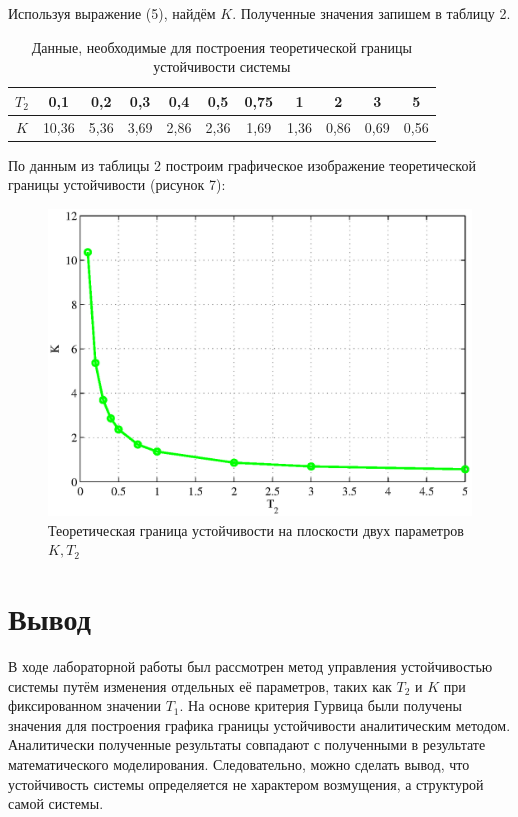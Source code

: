 \documentclass[a4paper,12pt]{article} %
\begin{document}
Используя выражение (5), найдём $K$. Полученные значения запишем в таблицу 2.
\begin{table}[h!]
	\caption{Данные, необходимые для построения теоретической границы устойчивости системы}
	\renewcommand{\arraystretch}{1.8} %
	\begin{center}
		\begin{tabular}{|c|c|c|c|c|c|c|c|c|c|c|}
			\hline $T_2$ & 0,1 & 0,2 & 0,3 & 0,4 & 0,5 & 0,75 & 1 & 2 & 3 & 5\\
			\hline $K$ & 10,36 & 5,36 & 3,69 & 2,86 & 2,36 & 1,69 & 1,36 & 0,86 & 0,69 & 0,56\\
			\hline
		\end{tabular}	
	\end{center}
\end{table}  
 
По данным из таблицы 2 построим графическое изображение теоретической границы устойчивости (рисунок 7):
\begin{figure}[H]
	\centering
	\includegraphics[width=1\linewidth]{scheme/plot4.eps}
	\caption{Теоретическая граница устойчивости на плоскости двух параметров $K, T_2$}
\end{figure}

\newpage
\section*{Вывод}
\par
В ходе лабораторной работы был рассмотрен метод управления устойчивостью системы путём изменения отдельных её параметров, таких как  $T_2$ и $K$ при фиксированном значении $T_1$. На основе критерия Гурвица были получены значения для построения графика границы устойчивости аналитическим методом. Аналитически полученные результаты совпадают с полученными в результате математического моделирования. Следовательно, можно сделать вывод, что устойчивость системы определяется не характером возмущения, а структурой самой системы.
\end{document}
